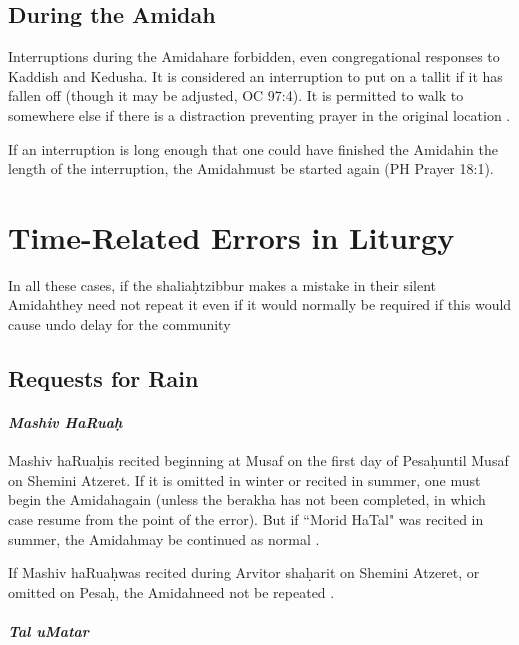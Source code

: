 \documentclass[11pt]{article}
\newcommand{\heth}{\d{h}}
\newcommand{\amidah}{Amidah\space}
\newcommand{\arvit}{Arvit}
\begin{document}
\subsection{During the \amidah}

Interruptions during the \amidah are forbidden, even congregational responses to Kaddish and Kedusha. It is considered an interruption to put on a tallit if it has fallen off (though it may be adjusted, OC 97:4).  It is permitted to walk to somewhere else if there is a distraction preventing prayer in the original location \parencite*[17:15]{PH}.

If an interruption is long enough that one could have finished the \amidah in the length of the interruption, the \amidah must be started again (PH Prayer 18:1).

\section{Time-Related Errors in Liturgy}

In all these cases, if the shalia\heth\space tzibbur makes a mistake in their silent \amidah they need not repeat it even if it would normally be required if this would cause undo delay for the community \parencite*[19:13]{Kitzur}

\subsection{Requests for Rain}

\paragraph{\textit{Mashiv HaRua\heth}}

Mashiv haRua\heth\space is recited beginning at Musaf on the first day of Pesa\heth\space until Musaf on Shemini Atzeret.  If it is omitted in winter or recited in summer, one must begin the \amidah again (unless the berakha has not been completed, in which case resume from the point of the error).  But if ``Morid HaTal" was recited in summer, the \amidah may be continued as normal \parencite*[18:4-5 citing OC 114]{PH}.

If Mashiv haRua\heth was recited during \arvit or sha\heth arit on Shemini Atzeret, or omitted on Pesa\heth , the \amidah need not be repeated \parencite*[19:2,4]{Kitzur}.

\paragraph{\textit{Tal uMatar}}
\end{document}
